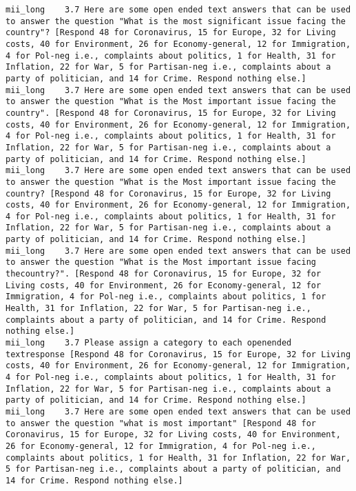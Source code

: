 \begin{lstlisting}[label=lst:promptvariants]
mii_long	3.7	Here are some open ended text answers that can be used to answer the question "What is the most significant issue facing the country"? [Respond 48 for Coronavirus, 15 for Europe, 32 for Living costs, 40 for Environment, 26 for Economy-general, 12 for Immigration, 4 for Pol-neg i.e., complaints about politics, 1 for Health, 31 for Inflation, 22 for War, 5 for Partisan-neg i.e., complaints about a party of politician, and 14 for Crime. Respond nothing else.]
mii_long	3.7	Here are some open ended text answers that can be used to answer the question "What is the Most important issue facing the country". [Respond 48 for Coronavirus, 15 for Europe, 32 for Living costs, 40 for Environment, 26 for Economy-general, 12 for Immigration, 4 for Pol-neg i.e., complaints about politics, 1 for Health, 31 for Inflation, 22 for War, 5 for Partisan-neg i.e., complaints about a party of politician, and 14 for Crime. Respond nothing else.]
mii_long	3.7	Here are some open ended text answers that can be used to answer the question "What is the Most important issue facing the country? [Respond 48 for Coronavirus, 15 for Europe, 32 for Living costs, 40 for Environment, 26 for Economy-general, 12 for Immigration, 4 for Pol-neg i.e., complaints about politics, 1 for Health, 31 for Inflation, 22 for War, 5 for Partisan-neg i.e., complaints about a party of politician, and 14 for Crime. Respond nothing else.]
mii_long	3.7	Here are some open ended text answers that can be used to answer the question "What is the Most important issue facing thecountry?". [Respond 48 for Coronavirus, 15 for Europe, 32 for Living costs, 40 for Environment, 26 for Economy-general, 12 for Immigration, 4 for Pol-neg i.e., complaints about politics, 1 for Health, 31 for Inflation, 22 for War, 5 for Partisan-neg i.e., complaints about a party of politician, and 14 for Crime. Respond nothing else.]
mii_long	3.7	Please assign a category to each openended textresponse [Respond 48 for Coronavirus, 15 for Europe, 32 for Living costs, 40 for Environment, 26 for Economy-general, 12 for Immigration, 4 for Pol-neg i.e., complaints about politics, 1 for Health, 31 for Inflation, 22 for War, 5 for Partisan-neg i.e., complaints about a party of politician, and 14 for Crime. Respond nothing else.]
mii_long	3.7	Here are some open ended text answers that can be used to answer the question "what is most important" [Respond 48 for Coronavirus, 15 for Europe, 32 for Living costs, 40 for Environment, 26 for Economy-general, 12 for Immigration, 4 for Pol-neg i.e., complaints about politics, 1 for Health, 31 for Inflation, 22 for War, 5 for Partisan-neg i.e., complaints about a party of politician, and 14 for Crime. Respond nothing else.]

\end{lstlisting}
